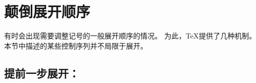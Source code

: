 \documentclass{book}
\begin{document}
\section{颠倒展开顺序}

有时会出现需要调整记号的一般展开顺序的情况。
为此，{\TeX}提供了几种机制。
本节中描述的某些控制序列并不局限于展开。

\subsection{提前一步展开：\protect{}}
\end{document}

